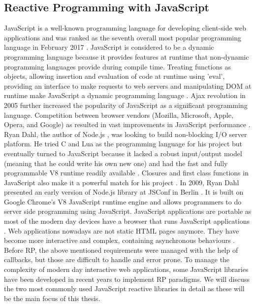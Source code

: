 \subsection{Reactive Programming with JavaScript}
JavaScript is a well-known programming language for developing client-side web applications and was ranked as the seventh overall most popular
programming language in February 2017 \cite{TiobeIndex}. JavaScript is considered to be a dynamic programming language because it provides features at runtime that non-dynamic programming languages provide during compile time. 
Treating functions as objects, allowing insertion and evaluation of code at runtime using 'eval', providing an interface to make requests to web servers and manipulating DOM at runtime make JavaScript a dynamic programming language \cite{White2010}. Ajax revolution in 2005 further increased the popularity of JavaScript as a significant programming language. Competition between browser vendors (Mozilla, Microsoft, Apple, Opera, and Google) as resulted in vast improvements in JavaScript performance \cite{cantelon2014node.js}. Ryan Dahl, the author of Node.js \cite{NodeJs}, was looking to build non-blocking I/O server platform. He tried C and Lua as the programming language for his project but eventually turned to JavaScript because it lacked a robust input/output model (meaning that he could write his own new one) and had the fast and fully programmable V8 runtime readily available \cite{9780321910578}. Closures and first class functions in JavaScript also make it a powerful match for his project \cite{teixeira2012professional}. In 2009, Ryan Dahl presented an early version of Node.js library at JSConf in Berlin \cite{JSConfNodeJS}. It is built on Google Chrome's V8 JavaScript runtime engine and allows programmers to do server side programming using JavaScript. JavaScript applications are portable as most of the modern day devices have a browser that runs JavaScript applications \cite{Richards:2010:ADB:1809028.1806598}.
Web applications nowadays are not static HTML pages anymore. They have become more interactive and complex, containing asynchronous behaviours \cite{6068340}. Before RP, the above mentioned requirements were managed with the help of callbacks, but those are difficult to handle and error prone. To manage the complexity of modern day interactive web applications, some JavaScript libraries have been developed in recent years to implement RP paradigms. We will discuss the two most commonly used JavaScript reactive libraries in detail as these will be the main focus of this thesis.

